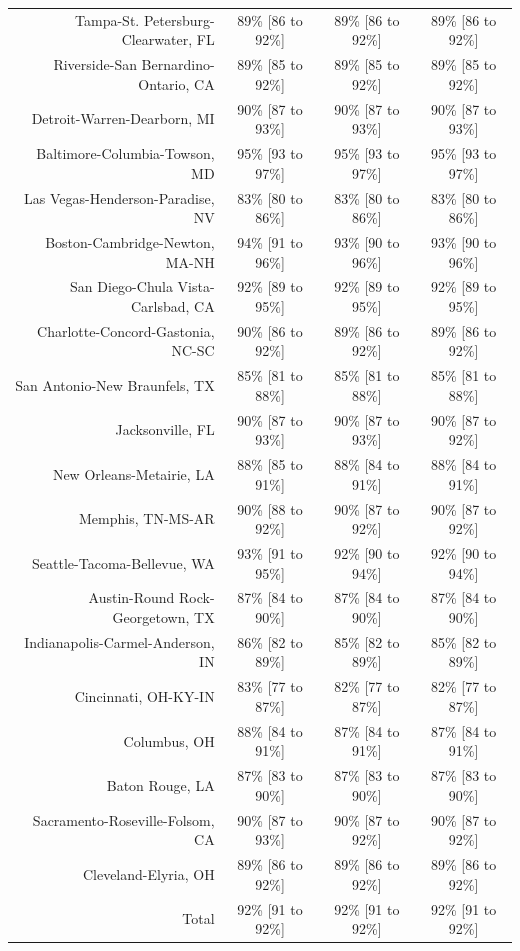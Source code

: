 \documentclass{article}
\begin{document}
\begin{table}[H]
\begin{tabular}{|r|c|c|c|}
		Tampa-St. Petersburg-Clearwater, FL & 89\% [86 to 92\%] & 89\% [86 to 92\%] & 89\% [86 to 92\%]\\
		Riverside-San Bernardino-Ontario, CA & 89\% [85 to 92\%] & 89\% [85 to 92\%] & 89\% [85 to 92\%]\\
		Detroit-Warren-Dearborn, MI & 90\% [87 to 93\%] & 90\% [87 to 93\%] & 90\% [87 to 93\%]\\
		Baltimore-Columbia-Towson, MD & 95\% [93 to 97\%] & 95\% [93 to 97\%] & 95\% [93 to 97\%]\\
		Las Vegas-Henderson-Paradise, NV & 83\% [80 to 86\%] & 83\% [80 to 86\%] & 83\% [80 to 86\%]\\
		Boston-Cambridge-Newton, MA-NH & 94\% [91 to 96\%] & 93\% [90 to 96\%] & 93\% [90 to 96\%]\\
		San Diego-Chula Vista-Carlsbad, CA & 92\% [89 to 95\%] & 92\% [89 to 95\%] & 92\% [89 to 95\%]\\
		Charlotte-Concord-Gastonia, NC-SC & 90\% [86 to 92\%] & 89\% [86 to 92\%] & 89\% [86 to 92\%]\\
		San Antonio-New Braunfels, TX & 85\% [81 to 88\%] & 85\% [81 to 88\%] & 85\% [81 to 88\%]\\
		Jacksonville, FL & 90\% [87 to 93\%] & 90\% [87 to 93\%] & 90\% [87 to 92\%]\\
		New Orleans-Metairie, LA & 88\% [85 to 91\%] & 88\% [84 to 91\%] & 88\% [84 to 91\%]\\
		Memphis, TN-MS-AR & 90\% [88 to 92\%] & 90\% [87 to 92\%] & 90\% [87 to 92\%]\\
		Seattle-Tacoma-Bellevue, WA & 93\% [91 to 95\%] & 92\% [90 to 94\%] & 92\% [90 to 94\%]\\
		Austin-Round Rock-Georgetown, TX & 87\% [84 to 90\%] & 87\% [84 to 90\%] & 87\% [84 to 90\%]\\
		Indianapolis-Carmel-Anderson, IN & 86\% [82 to 89\%] & 85\% [82 to 89\%] & 85\% [82 to 89\%]\\
		Cincinnati, OH-KY-IN & 83\% [77 to 87\%] & 82\% [77 to 87\%] & 82\% [77 to 87\%]\\
		Columbus, OH & 88\% [84 to 91\%] & 87\% [84 to 91\%] & 87\% [84 to 91\%]\\
		Baton Rouge, LA & 87\% [83 to 90\%] & 87\% [83 to 90\%] & 87\% [83 to 90\%]\\
		Sacramento-Roseville-Folsom, CA & 90\% [87 to 93\%] & 90\% [87 to 92\%] & 90\% [87 to 92\%]\\
		Cleveland-Elyria, OH & 89\% [86 to 92\%] & 89\% [86 to 92\%] & 89\% [86 to 92\%]\\
		\hline
		Total & 92\% [91 to 92\%] & 92\% [91 to 92\%] & 92\% [91 to 92\%]\\
		\hline
	\end{tabular}
\end{table}
\end{document}
